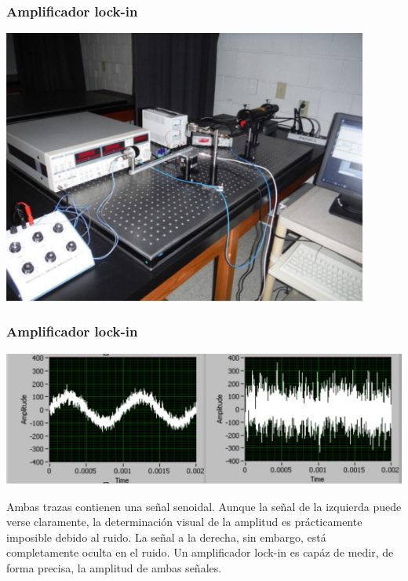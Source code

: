 \documentclass{beamer}
\begin{document}
\begin{frame}
\frametitle{Amplificador lock-in}
\begin{center}
\includegraphics[height=0.8\textheight,width=0.9\textwidth]{lia_w_experiment}
\end{center}
\end{frame} 

\begin{frame}
\frametitle{Amplificador lock-in}
\begin{center}
\includegraphics[height=0.4\textheight,width=\textwidth]{signal_lia}
\end{center}
Ambas trazas contienen una señal senoidal. Aunque la señal de la izquierda puede
verse claramente, {\color{red}la determinación visual de la amplitud es prácticamente
imposible debido al ruido}. La señal a la derecha, sin embargo, está
completamente oculta en el ruido. Un amplificador lock-in {\color{red}es capáz de medir, de
forma precisa, la amplitud de ambas señales}.
\end{frame} 
\end{document}
